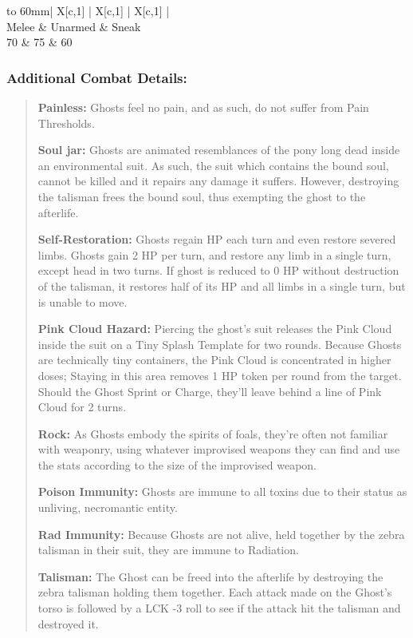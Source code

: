 \documentclass[11pt,a4paper,twocolumn]{book}
\begin{document}
	\bigskip
	{
		\begin{tabu} to 60mm{| X[c,1] | X[c,1] | X[c,1] |}
			\hline
			 \\ \hline
			Melee & Unarmed & Sneak                          \\
			70    & 75      & 60                             \\ \hline
		\end{tabu}
		
	}
	
	
	\subsubsection*{Additional Combat Details:}
	\begin{verse}
		\textbf{Painless:} Ghosts feel no pain, and as such, do not suffer from Pain Thresholds.
		
		\textbf{Soul jar:} Ghosts are animated resemblances of the pony long dead inside an environmental suit. As such, the suit which contains the bound soul, cannot be killed and it repairs any damage it suffers. However, destroying the talisman frees the bound soul, thus exempting the ghost to the afterlife.
		
		\textbf{Self-Restoration:} Ghosts regain HP each turn and even restore severed limbs. Ghosts gain 2 HP per turn, and restore any limb in a single turn, except head in two turns. If ghost is reduced to 0 HP without destruction of the talisman, it restores half of its HP and all limbs in a single turn, but is unable to move. 
		
		\textbf{Pink Cloud Hazard:} Piercing the ghost's suit releases the Pink Cloud inside the suit on a Tiny Splash Template for two rounds. Because Ghosts are technically tiny containers, the Pink Cloud is concentrated in higher doses; Staying in this area removes 1 HP token per round from the target. Should the Ghost Sprint or Charge, they'll leave behind a line of Pink Cloud for 2 turns.
		
		\textbf{Rock:} As Ghosts embody the spirits of foals, they're often not familiar with weaponry, using whatever improvised weapons they can find and use the stats according to the size of the improvised weapon.
		
		\textbf{Poison Immunity:} Ghosts are immune to all toxins due to their status as unliving, necromantic entity.
		
		\textbf{Rad Immunity:} Because Ghosts are not alive, held together by the zebra talisman in their suit, they are immune to Radiation.
		
		\textbf{Talisman:} The Ghost can be freed into the afterlife by destroying the zebra talisman holding them together. Each attack made on the Ghost's torso is followed by a LCK -3 roll to see if the attack hit the talisman and destroyed it.
	\end{verse}
	
\end{document}

